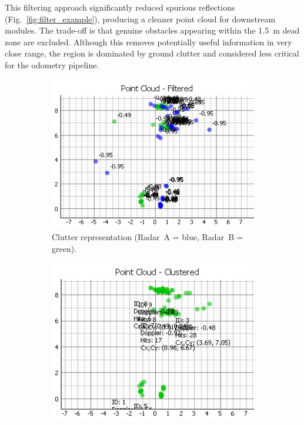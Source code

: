 \noindent
This filtering approach significantly reduced spurious reflections (Fig.~\ref{fig:filter_example}), producing a cleaner point cloud for downstream modules.  
The trade-off is that genuine obstacles appearing within the \SI{1.5}{\meter} dead zone are excluded.  
Although this removes potentially useful information in very close range, the region is dominated by ground clutter and considered less critical for the odometry pipeline.  

\begin{figure}[!htbp]
    \centering
    \begin{subfigure}{0.45\linewidth}
        \centering
        \includegraphics[width=\linewidth]{images/dualSensorClutterYAxis.png}
        \caption{Clutter representation (Radar~A = blue, Radar~B = green).}
        \label{fig:clutter_representation}
    \end{subfigure}
    \hfill
    \begin{subfigure}{0.45\linewidth}
        \centering
        \includegraphics[width=\linewidth]{images/dualSensorClutterYAxisCluster.png}

\end{subfigure}
\end{figure}
